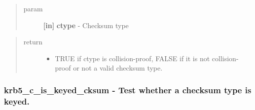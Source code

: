 \documentclass[letterpaper,10pt,english]{sphinxmanual}
\begin{document}
\begin{fulllineitems}
\label{appdev/refs/api/krb5_c_is_coll_proof_cksum:c.krb5_c_is_coll_proof_cksum}
\end{fulllineitems}

\begin{quote}\begin{description}
\item[{param}] \leavevmode
\textbf{{[}in{]}} \textbf{ctype} - Checksum type

\end{description}\end{quote}
\begin{quote}\begin{description}
\item[{return}] \leavevmode\begin{itemize}
\item {} 
TRUE if ctype is collision-proof, FALSE if it is not collision-proof or not a valid checksum type.

\end{itemize}

\end{description}\end{quote}


\subsubsection{krb5\_c\_is\_keyed\_cksum -  Test whether a checksum type is keyed.}
\label{appdev/refs/api/krb5_c_is_keyed_cksum::doc}\label{appdev/refs/api/krb5_c_is_keyed_cksum:krb5-c-is-keyed-cksum-test-whether-a-checksum-type-is-keyed}

\begin{fulllineitems}
\label{appdev/refs/api/krb5_c_is_keyed_cksum:c.krb5_c_is_keyed_cksum}
\end{fulllineitems}
\end{document}
